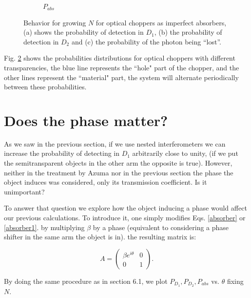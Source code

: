 \documentclass[12pt]{book}
\begin{document}
\begin{figure}[!t]
\begin{subfigure}[b]{0.45\linewidth}
\caption{$P_{abs}$}
\label{fig:BS1}
\end{subfigure}
\caption{Behavior for growing $N$ for optical choppers as imperfect absorbers, (a) shows the probability of detection in $D_{1}$, (b) the probability of detection in $D_{2}$ and (c) the probability of the photon being ``lost''.}
\label{fig:several_chpper}
\end{figure}
 

Fig. \ref{fig:several_chpper} shows the probabilities distributions for optical choppers with different transparencies, the blue line represents the ``hole" part of the chopper, and the other lines represent the ``material" part, the system will alternate periodically between these probabilities.

\section{Does the phase matter?}

As we saw in the previous section, if we use nested interferometers we can increase the probability of detecting in $D_{1}$ arbitrarily close to unity, (if we put the semitransparent objects in the other arm the opposite is true). However, neither in the treatment by Azuma \cite{Azuma} nor in the previous section the phase the object induces was considered, only its transmission coefficient. Is it unimportant?

To answer that question we explore how the object inducing a phase would affect our previous calculations. To introduce it, one simply modifies Eqs. \ref{absorber} or \ref{absorber1}. by multiplying $\beta$ by a phase (equivalent to considering a phase shifter in the same arm the object is in). the resulting matrix is:

\begin{equation}
 A=\begin{pmatrix} \beta e^{i \theta}& 0\\0&  1\end{pmatrix}.
 \end{equation}

By doing the same procedure as in section 6.1, we plot $P_{D_{1}},P_{D_{2}},P_{abs}$ vs. $\theta$ fixing $N$. 
\end{document}
